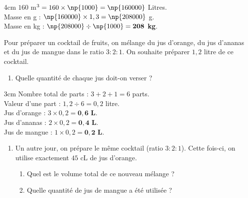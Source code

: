 \documentclass[a4paper]{book}
\begin{document}
{\begin{exercice}
\begin{enumerate}
            \begin{ZoneReponse}{4cm}
                $160$ m$^3 = 160 \times \np{1000} = \np{160000}$ Litres. \\[2ex]
                Masse en g : $\np{160000} \times 1,3 = \np{208000}$ g. \\[2ex]
                Masse en kg : $\np{208000} \div \np{1000} = \mathbf{208}$ \textbf{kg}.
            \end{ZoneReponse}
        \end{enumerate}
        

    \end{exercice}
    
        
    \begin{exercice}
        Pour préparer un cocktail de fruits, on mélange du jus d'orange, du jus d'ananas et du jus de mangue dans le ratio $3 : 2 : 1$.
        On souhaite préparer $1,2$ litre de ce cocktail.
        \medskip
        
        \begin{enumerate}
            \item Quelle quantité de chaque jus doit-on verser ?
        \end{enumerate}
        
        \begin{ZoneReponse}{3cm}
            Nombre total de parts : $3 + 2 + 1 = 6$ parts. \\
            Valeur d'une part : $1,2 \div 6 = 0,2$ litre. \\
            Jus d'orange : $3 \times 0,2 = \mathbf{0,6}$ \textbf{L}. \\
            Jus d'ananas : $2 \times 0,2 = \mathbf{0,4}$ \textbf{L}. \\
            Jus de mangue : $1 \times 0,2 = \mathbf{0,2}$ \textbf{L}.
        \end{ZoneReponse}

        \begin{enumerate}[resume]
            \item Un autre jour, on prépare le même cocktail (ratio $3:2:1$). Cette fois-ci, on utilise exactement $45$ cL de jus d'orange.
            \begin{enumerate}
                \item Quel est le volume total de ce nouveau mélange ?
                \item Quelle quantité de jus de mangue a été utilisée ?
            \end{enumerate}
        \end{enumerate}


\end{exercice}}
\end{document}
